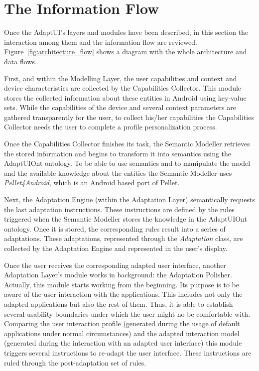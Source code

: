 \section{The Information Flow}
\label{sec:architecture_flow}

Once the AdaptUI's layers and modules have been described, in this section the 
interaction among them and the information flow are reviewed.
Figure~\ref{fig:architecture_flow} shows a diagram with the whole architecture
and data flows.

First, and within the Modelling Layer, the user capabilities and context and
device characteristics are collected by the Capabilities Collector. This module
stores the collected information about these entities in Android using key-value
sets. While the capabilities of the device and several context parameters are
gathered transparently for the user, to collect his/her capabilities the
Capabilities Collector needs the user to complete a profile personalization process.

Once the Capabilities Collector finishes its task, the Semantic Modeller retrieves
the stored information and begins to transform it into semantics using the
AdaptUIOnt ontology. To be able to use semantics and to manipulate the model
and the available knowledge about the entities the Semantic Modeller uses
\textit{Pellet4Android}, which is an Android based port of Pellet.

Next, the Adaptation Engine (within the Adaptation Layer) semantically requests
the last adaptation instructions. These instructions are defined by the rules
triggered when the Semantic Modeller stores the knowledge in the AdaptUIOnt
ontology. Once it is stored, the corresponding rules result into a series of
adaptations. These adaptations, represented through the \textit{Adaptation}
class, are collected by the Adaptation Engine and represented in the user's display.

Once the user receives the corresponding adapted user interface, another Adaptation
Layer's module works in background: the Adaptation Polisher. Actually, this module
starts working from the beginning. Its purpose is to be aware of the user interaction
with the applications. This includes not only the adapted applications but also
the rest of them. Thus, it is able to establish several usability boundaries
under which the user might no be comfortable with. Comparing the user interaction
profile (generated during the usage of default applications under normal
circumstances) and the adapted interaction model (generated during the interaction
with an adapted user interface) this module triggers several instructions to
re-adapt the user interface. These instructions are ruled through the
post-adaptation set of rules.

